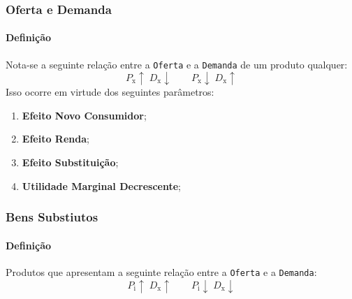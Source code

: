 \documentclass{article}
\begin{document}
        \subsubsection{Oferta e Demanda}
            \paragraph{Definição}Nota-se a seguinte relação entre a \texttt{Oferta} e a \texttt{Demanda} de um produto qualquer:
                \begin{equation}
                    \boxed{
                        P_{\text{x}}\uparrow
                        \;
                        D_{\text{x}}\downarrow
                    }
                    \qquad
                    \boxed{
                        P_{\text{x}}\downarrow
                        \;
                        D_{\text{x}}\uparrow
                    }
                \end{equation}
            Isso ocorre em virtude dos seguintes parâmetros:
                \begin{enumerate}[noitemsep]
                    \item \textbf{Efeito Novo Consumidor};
                    \item \textbf{Efeito Renda};
                    \item \textbf{Efeito Substituição};
                    \item \textbf{Utilidade Marginal Decrescente};
                \end{enumerate}

        \subsubsection{Bens Substiutos}
            \paragraph{Definição}Produtos que apresentam a seguinte relação entre a \texttt{Oferta} e a \texttt{Demanda}:
                \begin{equation}
                    \boxed{
                        P_{\text{i}}\uparrow
                        \;
                        D_{\text{x}}\uparrow
                    }
                    \qquad
                    \boxed{
                        P_{\text{i}}\downarrow
                        \;
                        D_{\text{x}}\downarrow
                    }
                \end{equation}
\end{document}
